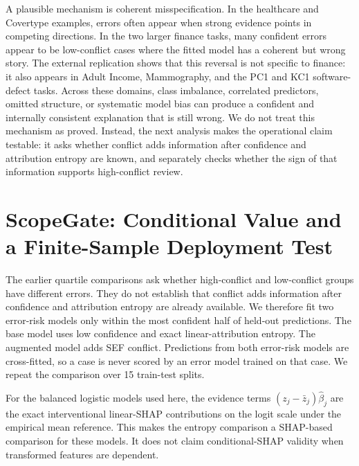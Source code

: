 \documentclass[11pt]{article}
\begin{document}
A plausible mechanism is coherent misspecification. In the healthcare and Covertype examples, errors often appear when strong evidence points in competing directions. In the two larger finance tasks, many confident errors appear to be low-conflict cases where the fitted model has a coherent but wrong story. The external replication shows that this reversal is not specific to finance: it also appears in Adult Income, Mammography, and the PC1 and KC1 software-defect tasks. Across these domains, class imbalance, correlated predictors, omitted structure, or systematic model bias can produce a confident and internally consistent explanation that is still wrong. We do not treat this mechanism as proved. Instead, the next analysis makes the operational claim testable: it asks whether conflict adds information after confidence and attribution entropy are known, and separately checks whether the sign of that information supports high-conflict review.

\section{ScopeGate: Conditional Value and a Finite-Sample Deployment Test}

The earlier quartile comparisons ask whether high-conflict and low-conflict groups have different errors. They do not establish that conflict adds information after confidence and attribution entropy are already available. We therefore fit two error-risk models only within the most confident half of held-out predictions. The base model uses low confidence and exact linear-attribution entropy. The augmented model adds SEF conflict. Predictions from both error-risk models are cross-fitted, so a case is never scored by an error model trained on that case. We repeat the comparison over 15 train-test splits.

For the balanced logistic models used here, the evidence terms $(z_j-\bar z_j)\widehat\beta_j$ are the exact interventional linear-SHAP contributions on the logit scale under the empirical mean reference. This makes the entropy comparison a SHAP-based comparison for these models. It does not claim conditional-SHAP validity when transformed features are dependent.

\begin{table}[!htbp]
\centering
\caption{ScopeGate analysis on held-out high-confidence predictions. Base AUC cross-fits error risk from low confidence and attribution entropy; $+$SEF AUC also includes conflict. Gap is high-conflict minus low-conflict error inside the ScopeGate cross-fitting split, so it need not equal the simpler quartile gap reported in earlier benchmark tables. Eligible/pass reports the fraction of splits meeting the information rule and, among eligible splits, the fraction passing the one-sided positive-association diagnostic. Time excludes model fitting and bootstrap stability.}
\label{tab:scope-diagnostic}
\resizebox{\textwidth}{!}{}
\end{table}
\end{document}
